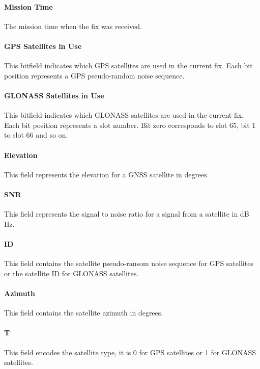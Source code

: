 \paragraph{Mission Time}
The mission time when the fix was received.

\paragraph{GPS Satellites in Use}

This bitfield indicates which GPS satellites are used in the current fix. Each bit position represents a GPS
pseudo-random noise sequence.

\paragraph{GLONASS Satellites in Use}
This bitfield indicates which GLONASS satellites are used in the current fix. Each bit position represents a slot
number. Bit zero corresponds to slot 65, bit 1 to slot 66 and so on.

\paragraph{Elevation}
This field represents the elevation for a GNSS satellite in degrees.

\paragraph{SNR}
This field represents the signal to noise ratio for a signal from a satellite in dB Hz.

\paragraph{ID}
This field contains the satellite pseudo-ransom noise sequence for GPS satellites or the satellite ID for GLONASS
satellites.

\paragraph{Azimuth}
This field contains the satellite azimuth in degrees.

\paragraph{T}
This field encodes the satellite type, it is 0 for GPS satellites or 1 for GLONASS satellites.

